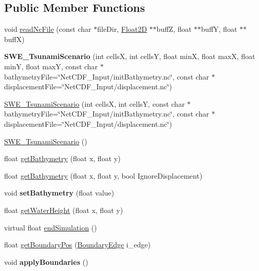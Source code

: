 \subsection*{Public Member Functions}
\begin{DoxyCompactItemize}
\item 
void \hyperlink{classSWE__TsunamiScenario_ade0bbbe3c90140c9d0ebf0f3a98023db}{read\-Nc\-File} (const char $\ast$file\-Dir, \hyperlink{classFloat2D}{Float2\-D} $\ast$$\ast$buff\-Z, float $\ast$$\ast$buff\-Y, float $\ast$$\ast$buff\-X)
\item 
\hypertarget{classSWE__TsunamiScenario_af2b667ccaf7187372ad9f734e47af8f4}{{\bfseries S\-W\-E\-\_\-\-Tsunami\-Scenario} (int cells\-X, int cells\-Y, float min\-X, float max\-X, float min\-Y, float max\-Y, const char $\ast$bathymetry\-File=\char`\"{}Net\-C\-D\-F\-\_\-\-Input/init\-Bathymetry.\-nc\char`\"{}, const char $\ast$displacement\-File=\char`\"{}Net\-C\-D\-F\-\_\-\-Input/displacement.\-nc\char`\"{})}\label{classSWE__TsunamiScenario_af2b667ccaf7187372ad9f734e47af8f4}

\item 
\hyperlink{classSWE__TsunamiScenario_a21f13a49c8982555506a6be984456991}{S\-W\-E\-\_\-\-Tsunami\-Scenario} (int cells\-X, int cells\-Y, const char $\ast$bathymetry\-File=\char`\"{}Net\-C\-D\-F\-\_\-\-Input/init\-Bathymetry.\-nc\char`\"{}, const char $\ast$displacement\-File=\char`\"{}Net\-C\-D\-F\-\_\-\-Input/displacement.\-nc\char`\"{})
\item 
\hyperlink{classSWE__TsunamiScenario_a8c172272a69ceb49cdf56e5e9e7626af}{S\-W\-E\-\_\-\-Tsunami\-Scenario} ()
\item 
float \hyperlink{classSWE__TsunamiScenario_aa2d2b0be8c3bc1d84ded47e075b5d433}{get\-Bathymetry} (float x, float y)
\item 
float \hyperlink{classSWE__TsunamiScenario_a93477e7237a1159933ffdea9469512ae}{get\-Bathymetry} (float x, float y, bool Ignore\-Displacement)
\item 
\hypertarget{classSWE__TsunamiScenario_ae940299bb294013569143297be56d3f3}{void {\bfseries set\-Bathymetry} (float value)}\label{classSWE__TsunamiScenario_ae940299bb294013569143297be56d3f3}

\item 
float \hyperlink{classSWE__TsunamiScenario_a134b99facf6169d2ef1edf0e5199b736}{get\-Water\-Height} (float x, float y)
\item 
virtual float \hyperlink{classSWE__TsunamiScenario_a0576923dc02b543dc34cec7de6e451a4}{end\-Simulation} ()
\item 
float \hyperlink{classSWE__TsunamiScenario_a701145868edb572d5958bbd739b80e0d}{get\-Boundary\-Pos} (\hyperlink{SWE__Scenario_8hh_aa5e01e3f7df312f7b9b0d02521141fcc}{Boundary\-Edge} i\-\_\-edge)
\item 
\hypertarget{classSWE__TsunamiScenario_a5ead2d1563167aac3c2b89bf557a0d01}{void {\bfseries apply\-Boundaries} ()}\label{classSWE__TsunamiScenario_a5ead2d1563167aac3c2b89bf557a0d01}


\end{DoxyCompactItemize}
